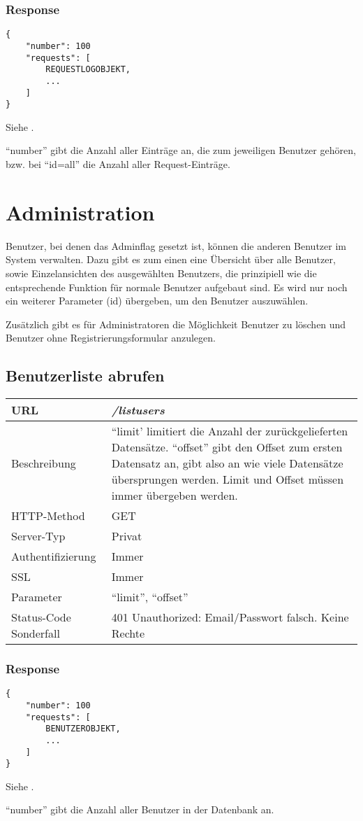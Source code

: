 \documentclass[ngerman,titlepage,parskip=true]{scrartcl}
\newcommand{\requestURL}[1]{\textit{#1}}
\newcommand{\request}[9]
{\subsection{#1}
\begin{tabular}{|p{0.2\textwidth}|p{0.7\textwidth}|}
\hline
  URL & \requestURL{#2}\\\hline
    Beschreibung & #3\\\hline
  HTTP-Method & #4\\\hline
  Server-Typ & #5\\\hline
  Authentifizierung & #6\\\hline
  SSL & #7\\\hline
  Parameter & #8\\\hline
  Status-Code Sonderfall & #9\\\hline
 \end{tabular}\vspace*{1em}}
{}%
{}%
{}%
{}%
{}%
{}%
{}%
{}%
\begin{document}
	
\subsubsection{Response}		
		\begin{lstlisting}
{
	"number": 100
	"requests": [
		REQUESTLOGOBJEKT,
		...
	]
}
		\end{lstlisting}
		
Siehe .

		``number'' gibt die Anzahl aller Einträge an, die zum jeweiligen Benutzer gehören, bzw. bei \mbox{``id=all''} die Anzahl aller Request-Einträge.
		
	

\section{Administration}

Benutzer, bei denen das Adminflag gesetzt ist, können die anderen Benutzer im System verwalten. 
Dazu gibt es zum einen eine Übersicht über alle Benutzer, sowie Einzelansichten des ausgewählten Benutzers, die prinzipiell wie die entsprechende Funktion für normale Benutzer aufgebaut sind.
Es wird nur noch ein weiterer Parameter (id) übergeben, um den Benutzer auszuwählen.

Zusätzlich gibt es für Administratoren die Möglichkeit Benutzer zu löschen und Benutzer ohne Registrierungsformular anzulegen.

\request{Benutzerliste abrufen}%
{/listusers}%
{``limit' limitiert die Anzahl der zurückgelieferten Datensätze. ``offset'' gibt den Offset zum ersten Datensatz an, gibt also an wie viele Datensätze übersprungen werden. Limit und Offset müssen immer übergeben werden.}%
{GET}%
{Privat}%
{Immer}%
{Immer}%
{``limit'', ``offset''}%
{401 Unauthorized: Email/Passwort falsch. Keine Rechte}%
\subsubsection{Response}		
		\begin{lstlisting}
{
	"number": 100
	"requests": [
		BENUTZEROBJEKT,
		...
	]
}
		\end{lstlisting}
		
Siehe .

		``number'' gibt die Anzahl aller Benutzer in der Datenbank an.
		
\clearpage
\end{document}
